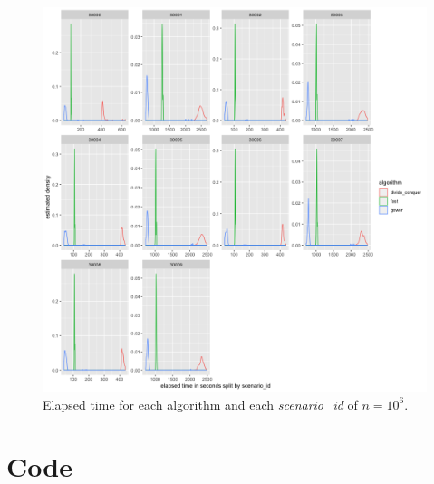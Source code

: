 \documentclass[11pt]{report}
\begin{document}
\begin{figure}[!ht]
\centering
    \includegraphics{./images/elapsed_time_1000000.png}
    \caption{Elapsed time for each algorithm and each \textit{scenario\_id} of $n=10^6$.}
    \label{elapsed_time_1000000}
\end{figure}

\FloatBarrier


\chapter{Code}
\label{chap:code}
\end{document}
